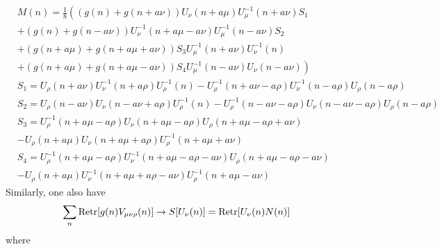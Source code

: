 \begin{equation}
\begin{split}
&M(n)=\frac{1}{8}\left((g(n)+g(n+a\nu))U_{\nu}(n+a\mu)U_{\mu}^{-1}(n+a\nu)S_1\right.\\
&\left.+(g(n)+g(n-a\nu))U^{-1}_{\nu}(n+a\mu-a\nu)U_{\mu}^{-1}(n-a\nu)S_2\right.\\
&\left.+(g(n+a\mu)+g(n+a\mu+a\nu))S_3U_{\mu}^{-1}(n+a\nu)U_{\nu}^{-1}(n)\right.\\
&\left.+(g(n+a\mu)+g(n+a\mu-a\nu))S_4U^{-1}_{\mu}(n-a\nu)U_{\nu}(n-a\nu)\right)\\
&S_1=U_{\rho}(n+a\nu)U_{\nu}^{-1}(n+a\rho)U_{\rho}^{-1}(n)-U_{\rho}^{-1}(n+a\nu-a\rho)U_{\nu}^{-1}(n-a\rho)U_{\rho}(n-a\rho)\\
&S_2=U_{\rho}(n-a\nu)U_{\nu}(n-a\nu+a\rho)U_{\rho}^{-1}(n)-U_{\rho}^{-1}(n-a\nu-a\rho)U_{\nu}(n-a\nu-a\rho)U_{\rho}(n-a\rho)\\
&S_3=U^{-1}_{\rho}(n+a\mu-a\rho)U_{\nu}(n+a\mu-a\rho)U_{\rho}(n+a\mu-a\rho+a\nu)\\
&-U_{\rho}(n+a\mu)U_{\nu}(n+a\mu+a\rho)U_{\rho}^{-1}(n+a\mu+a\nu)\\
&S_4=U^{-1}_{\rho}(n+a\mu-a\rho)U_{\nu}^{-1}(n+a\mu-a\rho-a\nu)U_{\rho}(n+a\mu-a\rho-a\nu)\\
&-U_{\rho}(n+a\mu)U_{\nu}^{-1}(n+a\mu+a\rho-a\nu)U_{\rho}^{-1}(n+a\mu-a\nu)
\end{split}
\end{equation}
Similarly, one also have
\begin{equation}
\begin{split}
&\sum _n{\rm Retr}[g(n)V_{\mu\nu\rho}(n)]\to S[U_{\nu}(n)]={\rm Retr}[U_{\nu}(n)N(n)]
\end{split}
\end{equation}
where
